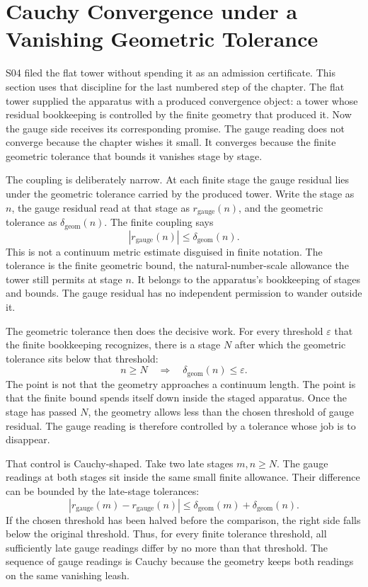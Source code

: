 \section{Cauchy Convergence under a Vanishing Geometric Tolerance}

S04 filed the flat tower without spending it as an admission certificate. This
section uses that discipline for the last numbered step of the chapter. The
flat tower supplied the apparatus with a produced convergence object: a tower
whose residual bookkeeping is controlled by the finite geometry that produced
it. Now the gauge side receives its corresponding promise. The gauge reading
does not converge because the chapter wishes it small. It converges because the
finite geometric tolerance that bounds it vanishes stage by stage.

The coupling is deliberately narrow. At each finite stage the gauge residual
lies under the geometric tolerance carried by the produced tower. Write the
stage as \(n\), the gauge residual read at that stage as \(r_{\mathrm{gauge}}(n)\),
and the geometric tolerance as \(\delta_{\mathrm{geom}}(n)\). The finite coupling
says
\[
  |r_{\mathrm{gauge}}(n)| \le \delta_{\mathrm{geom}}(n).
\]
This is not a continuum metric estimate disguised in finite notation. The
tolerance is the finite geometric bound, the natural-number-scale allowance the tower
still permits at stage \(n\). It belongs to the apparatus's bookkeeping of
stages and bounds. The gauge residual has no independent permission to wander
outside it.

The geometric tolerance then does the decisive work. For every threshold
\(\varepsilon\) that the finite bookkeeping recognizes, there is a stage \(N\)
after which the geometric tolerance sits below that threshold:
\[
  n \ge N
  \quad\Longrightarrow\quad
  \delta_{\mathrm{geom}}(n) \le \varepsilon.
\]
The point is not that the geometry approaches a continuum length. The point is
that the finite bound spends itself down inside the staged apparatus. Once the
stage has passed \(N\), the geometry allows less than the chosen threshold of
gauge residual. The gauge reading is therefore controlled by a tolerance whose
job is to disappear.

That control is Cauchy-shaped. Take two late stages \(m,n \ge N\). The gauge
readings at both stages sit inside the same small finite allowance. Their
difference can be bounded by the late-stage tolerances:
\[
  |r_{\mathrm{gauge}}(m)-r_{\mathrm{gauge}}(n)|
  \le
  \delta_{\mathrm{geom}}(m)+\delta_{\mathrm{geom}}(n).
\]
If the chosen threshold has been halved before the comparison, the right side
falls below the original threshold. Thus, for every finite tolerance threshold,
all sufficiently late gauge readings differ by no more than that threshold. The
sequence of gauge readings is Cauchy because the geometry keeps both readings
on the same vanishing leash.

